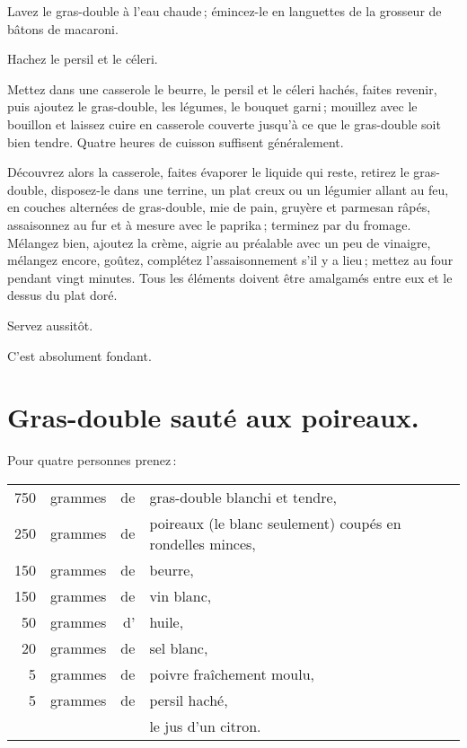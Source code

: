 Lavez le gras-double à l'eau chaude ; émincez-le en languettes de la grosseur
de bâtons de macaroni.

Hachez le persil et le céleri.

Mettez dans une casserole le beurre, le persil et le céleri hachés, faites
revenir, puis ajoutez le gras-double, les légumes, le bouquet garni ; mouillez
avec le bouillon et laissez cuire en casserole couverte jusqu'à ce que le
gras-double soit bien tendre. Quatre heures de cuisson suffisent généralement.

Découvrez alors la casserole, faites évaporer le liquide qui reste, retirez le
gras-double, disposez-le dans une terrine, un plat creux ou un légumier allant
au feu, en couches alternées de gras-double, mie de pain, gruyère et parmesan
râpés, assaisonnez au fur et à mesure avec le paprika ; terminez par du fromage.
Mélangez bien, ajoutez la crème, aigrie au préalable avec un peu de vinaigre,
mélangez encore, goûtez, complétez l'assaisonnement s'il y a lieu ; mettez au
four pendant vingt minutes. Tous les éléments doivent être amalgamés entre eux
et le dessus du plat doré.

Servez aussitôt.

C'est absolument fondant.

\section*{\centering Gras-double sauté aux poireaux.}

Pour quatre personnes prenez :

\medskip

\footnotesize
\begin{longtable}{rrrp{18em}}
    750 & grammes & de & gras-double blanchi et tendre,                                                   \\
    250 & grammes & de & poireaux (le blanc seulement) coupés en rondelles minces,                        \\
    150 & grammes & de & beurre,                                                                          \\
    150 & grammes & de & vin blanc,                                                                       \\
     50 & grammes & d' & huile,                                                                           \\
     20 & grammes & de & sel blanc,                                                                       \\
      5 & grammes & de & poivre fraîchement moulu,                                                        \\
      5 & grammes & de & persil haché,                                                                    \\
        &         &    & le jus d'un citron.                                                              \\
\end{longtable}
\normalsize

